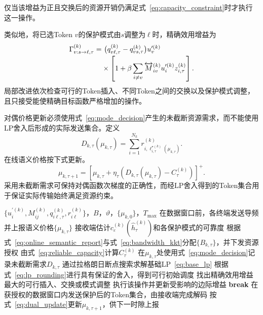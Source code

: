 \documentclass[journal]{IEEEtran}
\begin{document}
仅当该增益为正且交换后的资源开销仍满足式~\eqref{eq:capacity_constraint}时才执行这一操作。

类似地，将已选Token $v$的保护模式由$s$调整为$\ell$时，精确效用增益为
\begin{align}
\Gamma_{v:s\rightarrow\ell,\tau}^{(k)}
=&~\big(q_{v\ell,\tau}^{(k)}-q_{vs,\tau}^{(k)}\big)u_v^{\prime(k)}
\notag\\[-0.2em]
&\times\left[1+\beta\sum_{i\neq v}\overleftrightarrow M_{iv}^{(k)}u_i^{\prime(k)}z_{i,\tau}^{(k)}\right].
\label{eq:mode_change_gain}
\end{align}
局部改进依次检查可行的Token插入、不同Token之间的交换以及保护模式调整，且只接受能使精确目标函数严格增加的操作。

对偶价格更新必须使用式~\eqref{eq:mode_decision}产生的未截断资源需求，而不能使用LP舍入后形成的实际发送集合。定义
\begin{equation}
D_{k,\tau}(\mu_{k,\tau})
=\sum_{i=1}^{N_k}
r_{i,\ell_{i,\tau}^{\star(k)}(\mu_{k,\tau})}^{(k)}.
\label{eq:untruncated_demand}
\end{equation}
在线语义价格按下式更新。
\begin{equation}
\mu_{k,\tau+1}
=\left[\mu_{k,\tau}
+\eta_{\tau}\left(D_{k,\tau}(\mu_{k,\tau})-C_{\tau}^{(k)}\right)\right]^+.
\label{eq:dual_update}
\end{equation}
采用未截断需求可保持对偶函数次梯度的正确性，而经LP舍入得到的Token集合用于保证实际传输始终满足资源约束。

\begin{algorithm}[t]
\caption{可靠性感知的Token选择与带宽调度}
\label{alg:schedule}
\begin{algorithmic}[1]
\REQUIRE $\{u_i^{\prime(k)},M_{ij}^{(k)},q_{i\ell,\tau}^{(k)},r_{i\ell}^{(k)}\}$，$B$，$\vartheta$，$\{\mu_{k,0}\}$，$T_{\max}$
\STATE 在数据窗口前，各终端发送导频并上报语义价格$\{\mu_{k,\tau}\}$
\STATE 接收端估计$c_{\varepsilon}^{(k)}(\widehat h_{\tau}^{(k)})$和各保护模式的可靠度
\STATE 根据式~\eqref{eq:online_semantic_report}与式~\eqref{eq:bandwidth_kkt}分配$\{B_{k,\tau}\}$，并下发资源授权
\STATE 由式~\eqref{eq:reliable_capacity}计算$C_{\tau}^{(k)}$
\STATE 在$\mu_{k,\tau}$处使用式~\eqref{eq:mode_decision}记录未截断需求$D_{k,\tau}$
\STATE 通过拉格朗日断点搜索求解基础LP~\eqref{eq:base_lp}
\STATE 根据式~\eqref{eq:lp_rounding}进行具有保证的舍入，得到可行初始调度
\STATE 找出精确效用增益最大的可行插入、交换或模式调整
\STATE 执行该操作并更新受影响的边际增益
\ELSE
\STATE \textbf{break}
\ENDIF
\ENDFOR
\STATE 在获授权的数据窗口内发送保护后的Token集合，由接收端完成解码
\STATE 按式~\eqref{eq:dual_update}更新$\mu_{k,\tau+1}$，供下一时隙上报
\ENDFOR
\ENDFOR
\end{algorithmic}
\end{algorithm}
\end{document}
